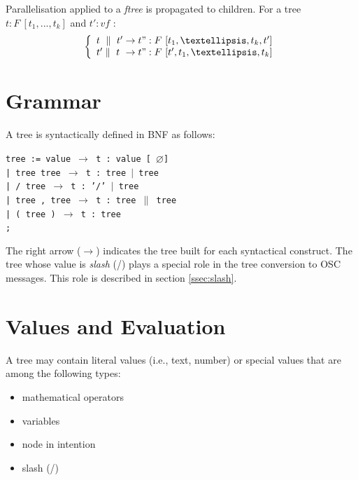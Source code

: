 \documentclass[runningheads]{llncs}
\newcommand{\code}	[2][0.9]	{\vspace{0mm}\begin{center}\colorbox{mygrey}{
							\begin{minipage}[t]{#1\columnwidth} 
							{\small \texttt{#2}}
							\end{minipage}}\end{center}}
\newcommand{\llist}	[1]		{\ensuremath{[#1_1,...,#1_k]}}
\newcommand{\nulltree}	{\ensuremath{\varnothing}}
\newcommand{\seq}		{\ensuremath{|}}
\newcommand{\paral}		{\ensuremath{\parallel}}
\newcommand{\foret}		{\ensuremath{F}}
\newcommand{\ftree}		{ftree}
\newcommand{\etc}		{\ensuremath{…}}
\newcommand{\ula}		{\hspace*{8mm}}
\begin{document}
Parallelisation applied to a \emph{\ftree} is propagated to children. For a tree $t : \foret\ \llist{t}$ and $t' :  v f$ :
\[
\left\{
\begin{array}{l}
	t\  \paral\ t'  \to  t" : \foret\ [t_1,\etc,t_k,t']\\
	t' \paral\ t \ \to  t" : \foret\ [t',t_1,\etc,t_k]\\
\end{array}
\right.
\]


\section{Grammar}\label{agram}

A tree is syntactically defined in BNF as follows:
\code{tree := value      \hspace*{8mm} $\to$ t : value [ \nulltree ] \\
\ula | tree tree         \hspace*{4mm} $\to$ t : tree \seq\ tree \\
\ula | / tree            \hspace*{9.7mm} $\to$ t : '/' \seq\ tree\\
\ula | tree , tree       \hspace*{0mm}  $\to$ t : tree \paral\ tree \\
\ula | ( tree )          \hspace*{6mm} $\to$ t : tree \\
\ula ;
}
The right arrow ($\to$) indicates the tree built for each syntactical construct. 
The tree whose value is \emph{slash} (/) plays a special role in the tree conversion to OSC messages. This role is described in section \ref{ssec:slash}.


\section{Values and Evaluation}\label{sec:valeurs}

A tree may contain literal values (i.e., text, number) or special values that are among the following types:
\begin{itemize}
 \setlength\itemsep{0.0em}
\item mathematical operators
\item variables
\item node in intention
\item slash (/)
\end{itemize}
\end{document}
